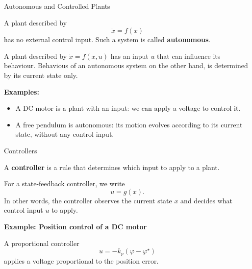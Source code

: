 \documentclass{beamer}
\begin{document}
\begin{frame}{Autonomous and Controlled Plants}
	\begin{flushleft}
		
		A plant described by
		\[
		\dot{x}=f(x)
		\]
		has no external control input. Such a system is called \textbf{autonomous}.
		
		\bigskip
		
		A plant described by \(\dot{x}=f(x,u)\) has an input \(u\) that can influence
		its behaviour. Behavious of an autonomous system on the other hand, is determined by its current state only.
		
		\bigskip
		
		{
			
		\textbf{Examples:}
		
		\begin{itemize}
			\item  A DC motor is a plant with an input: we can apply a voltage to control it.
			\item A free pendulum is autonomous: its motion evolves according to its current state, without any control input.
		\end{itemize}
	}
		
	\end{flushleft}
\end{frame}


\begin{frame}{Controllers}
	\begin{flushleft}
		
		A \textbf{controller} is a rule that determines which input to apply to a plant.
		
		For a state-feedback controller, we write
		\[
		u=g(x).
		\]
		In other words, the controller observes the current state \(x\) and decides
		what control input \(u\) to apply.
		
		\bigskip
		
		{\mycolor{mydarkblue}
		\textbf{Example: Position control of a DC motor}
		
		A proportional controller
		\[
		u=-k_p(\varphi-\varphi^\star)
		\]
		applies a voltage proportional to the position error.
	}
	\end{flushleft}
\end{frame}
\end{document}

